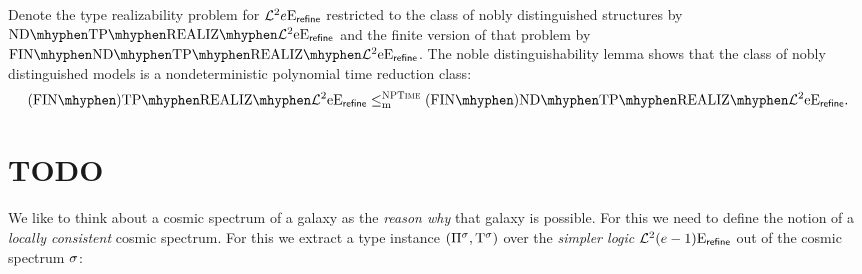 Denote the type realizability problem for $\mathcal{L}^{2}{e}\mathrm{E}_{\mathsf{refine}}$ restricted to
the class of nobly distinguished structures by $\NDReal{\vFo2\Eea\sze\agrefine}$ and the finite
version of that problem by $\FinNDReal{\vFo2\Eea\sze\agrefine}$.
The noble distinguishability lemma shows that the class of nobly distinguished
models is a nondeterministic polynomial time reduction class:
\[
  \FinAReal{\vFo2\Eea\sze\agrefine} \red{\cNP} \FinANDReal{\vFo2\Eea\sze\agrefine}.
\]
\section{TODO}
We like to think about a cosmic spectrum of a galaxy as the \emph{reason why}
that galaxy is possible. For this we need to define the notion of a
\emph{locally consistent} cosmic spectrum. For this we extract a type instance
$(\Pi^{\sigma},\mathrm{T}^{\sigma})$ over the \emph{simpler logic}
$\mathcal{L}^{2}_{{}}{(e-1)}\mathrm{E}_{\mathsf{refine}}$ out of the cosmic spectrum $\sigma$:
